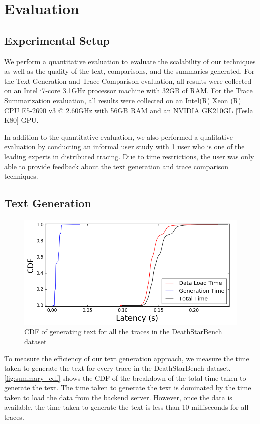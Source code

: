 \section{Evaluation}
\label{sec:evaluation}

\subsection{Experimental Setup}

We perform a quantitative evaluation to evaluate
the scalability of our techniques as well as the quality
of the text, comparisons, and the summaries generated.
For the Text Generation and Trace Comparison evaluation,
all results were collected on
an Intel i7-core 3.1GHz processor machine with 32GB of RAM.
For the Trace Summarization evaluation, all results were
collected on an Intel(R) Xeon (R) CPU E5-2690 v3 @ 2.60GHz
with 56GB RAM and an NVIDIA GK210GL [Tesla K80] GPU.

In addition to the quantitative evaluation, we also
performed a qualitative evaluation by conducting
an informal user study with 1 user who is one of the 
leading experts in distributed tracing. Due to time restrictions,
the user was only able to provide feedback about the text generation
and trace comparison techniques.

\subsection{Text Generation}

\begin{figure}[tbh]
    \centering
    \includegraphics[width=\linewidth]{"fig/summary_cdf"}
    \caption{CDF of generating text for all the traces in the DeathStarBench dataset}
    \label{fig:summary_cdf}
\end{figure}

 To measure the efficiency of our text generation approach, we measure the time taken
to generate the text for every trace in the DeathStarBench dataset. \autoref{fig:summary_cdf}
shows the CDF of the breakdown of the total time taken to generate the text. The time taken
to generate the text is dominated by the time taken to load the data from the backend server.
However, once the data is available, the time taken to generate the text is less than 10 milliseconds
for all traces.

